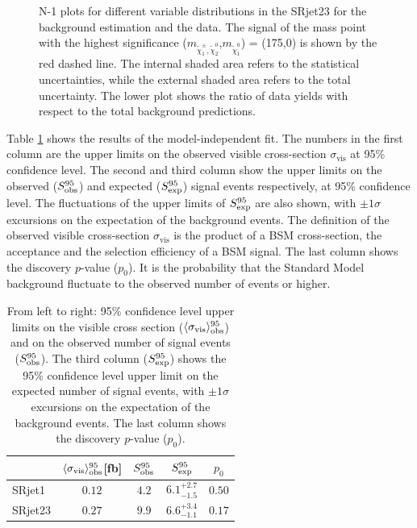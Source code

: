 \begin{figure}[htbp]
\caption{N-1 plots for different variable distributions in the SRjet23 for the background estimation and the data. The signal of the mass point with the highest significance ($m_{\tilde{\chi}_1^\pm , \tilde{\chi}_2^0}$,$m_{\tilde{\chi}_1^0}$) = (175,0) is shown by the red dashed line. The internal shaded area refers to the statistical uncertainties, while the external shaded area refers to the total uncertainty. The lower plot shows the ratio of data yields with respect to the total background predictions.}
\label{fig:result_Nminus1_2}
\end{figure}

Table \ref{tab:result_upper_limit} shows the results of the model-independent fit.
The numbers in the first column are the upper limits on the observed visible cross-section $\sigma_{\text{vis}}$ at 95\% confidence level.
The second and third column show the upper limits on the observed ($S_{\rm obs}^{95}$) and expected ($S_{\rm exp}^{95}$) signal events respectively, at 95\% confidence level.
The fluctuations of the upper limits of $S_{\rm exp}^{95}$ are also shown, with $\pm 1\sigma$ excursions on the expectation of the background events.
The definition of the observed visible cross-section $\sigma_{\text{vis}}$ is the product of a BSM cross-section, the acceptance and the selection efficiency of a BSM signal.
The last column shows the discovery $p$-value ($p_0$).
It is the probability that the Standard Model background fluctuate to the observed number of events or higher.

\begin{table}[htbp]
\begin{center}
\begin{tabular}{|l|cccc|}
\hline
& $\langle \sigma_{\text{vis}} \rangle_{\rm obs}^{95}$[fb]  &  $S_{\rm obs}^{95}$  & $S_{\rm exp}^{95}$ & $p_0$ \\
\hline
\hline
SRjet1  & $0.12$ & $4.2$ & $ { 6.1 }^{ +2.7 }_{ -1.5 }$ & $ 0.50$ \\
\hline
SRjet23 & $0.27$ & $9.9$ & $ { 6.6 }^{ +3.4 }_{ -1.1 }$ & $ 0.17$ \\
\hline
\end{tabular}
\caption{
From left to right:
95\% confidence level upper limits on the visible cross section ($\langle \sigma_{\text{vis}} \rangle_{\rm obs}^{95}$)
and on the observed number of signal events ($S_{\rm obs}^{95}$).
The third column ($S_{\rm exp}^{95}$) shows the 95\% confidence level upper limit on the expected number of signal events,
with $\pm 1\sigma$ excursions on the expectation of the background events.
The last column shows the discovery $p$-value ($p_0$).}
\label{tab:result_upper_limit}
\end{center}
\end{table}

